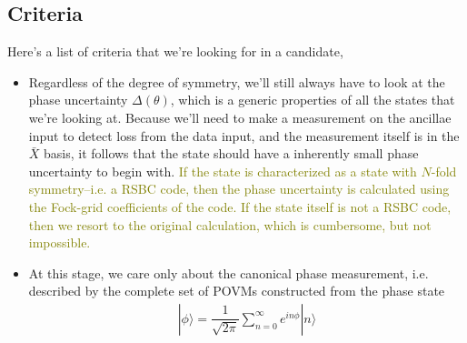 \documentclass{article}
\begin{document}
\subsection{Criteria}
Here's a list of criteria that we're looking for in a candidate,
\begin{itemize}
    \item Regardless of the degree of symmetry, we'll still always have to look at the phase uncertainty $\Delta(\theta)$, which is a generic properties of all the states that we're looking at. Because we'll need to make a measurement on the ancillae input to detect loss from the data input, and the measurement itself is in the $\bar{X}$ basis, it follows that the state should have a inherently small phase uncertainty to begin with. \textcolor{olive}{If the state is characterized as a state with $N$-fold symmetry--i.e. a RSBC code, then the phase uncertainty is calculated using the Fock-grid coefficients of the code. If the state itself is not a RSBC code, then we resort to the original calculation, which is cumbersome, but not impossible.} 
    \item At this stage, we care only about the canonical phase measurement, i.e. described by the complete set of POVMs constructed from the phase state 
    \begin{align}|\phi\rangle=\dfrac{1}{\sqrt{2\pi}}\sum_{n=0}^\infty e^{in\phi}|n\rangle\end{align}
\end{itemize}
\end{document}
